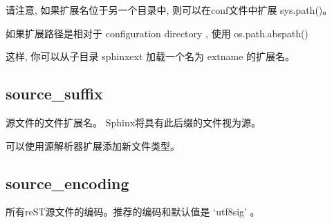 \documentclass[a4paper,10pt,english]{sphinxmanual}
\begin{document}
\sphinxAtStartPar
请注意, 如果扩展名位于另一个目录中, 则可以在conf文件中扩展 sys.path()。

\sphinxAtStartPar
如果扩展路径是相对于 configuration directory , 使用 os.path.abspath()

\begin{sphinxVerbatim}[commandchars=\\\{\}]
  
  \PYG{p}{[}\PYG{p}{]}
\end{sphinxVerbatim}

\sphinxAtStartPar
这样, 你可以从子目录 sphinxext 加载一个名为 extname 的扩展名。


\subsection{source\_suffix}
\label{\detokenize{sphinx_conf:source-suffix}}
\sphinxAtStartPar
源文件的文件扩展名。 Sphinx将具有此后缀的文件视为源。

\begin{sphinxVerbatim}[commandchars=\\\{\}]
  
     
     
     
\end{sphinxVerbatim}

\sphinxAtStartPar
可以使用源解析器扩展添加新文件类型。


\subsection{source\_encoding}
\label{\detokenize{sphinx_conf:source-encoding}}
\sphinxAtStartPar
所有reST源文件的编码。推荐的编码和默认值是 ‘utf\sphinxhyphen{}8\sphinxhyphen{}sig’ 。
\end{document}
